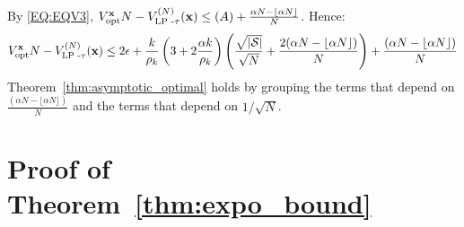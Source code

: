 By \eqref{EQ:EQV3}, $V_{\text{opt}}^{\textbf{x}}{N} - V_{\text{LP -} \tau}^{(N)}(\textbf{x}) \le (A) + \frac{\alpha N - \lfloor\alpha N\rfloor}{N}$. Hence: 
\begin{equation*}
   V_{\text{opt}}^{\textbf{x}}{N} - V_{\text{LP -} \tau}^{(N)}(\textbf{x}) \leq  2\epsilon + \frac{k}{\rho_{k}}\left(3 + 2\frac{\alpha k}{\rho_{k}} \right)\left(\frac{\sqrt{|\mathcal{S}|}}{\sqrt{N}} + \frac{2(\alpha N - \lfloor{\alpha N}\rfloor)}{N}\right) + \frac{(\alpha N - \lfloor{\alpha N}\rfloor)}{N}
\end{equation*}
Theorem~\ref{thm:asymptotic_optimal} holds by grouping the terms that depend on $\frac{(\alpha N - \lfloor{\alpha N}\rfloor)}{N}$ and the terms that depend on $1/\sqrt{N}$.

\section{Proof of Theorem~\ref{thm:expo_bound}}
\label{apx:PFcomp_expo}

